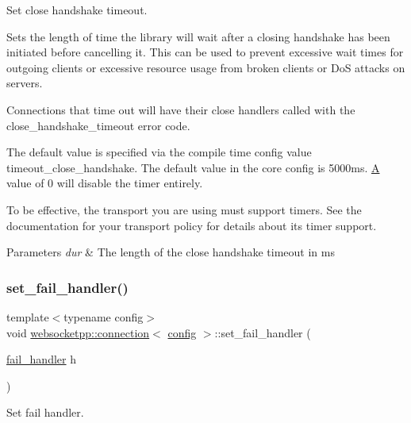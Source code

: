Set close handshake timeout. 

Sets the length of time the library will wait after a closing handshake has been initiated before cancelling it. This can be used to prevent excessive wait times for outgoing clients or excessive resource usage from broken clients or DoS attacks on servers.

Connections that time out will have their close handlers called with the close\+\_\+handshake\+\_\+timeout error code.

The default value is specified via the compile time config value \textquotesingle{}timeout\+\_\+close\+\_\+handshake\textquotesingle{}. The default value in the core config is 5000ms. \mbox{\hyperlink{struct_a}{A}} value of 0 will disable the timer entirely.

To be effective, the transport you are using must support timers. See the documentation for your transport policy for details about its timer support.


\begin{DoxyParams}{Parameters}
{\em dur} & The length of the close handshake timeout in ms \\
\hline
\end{DoxyParams}
\mbox{\label{classwebsocketpp_1_1connection_a8d2515bc6821f90c531efe77c8a32569}} 
\subsubsection{\texorpdfstring{set\+\_\+fail\+\_\+handler()}{set\_fail\_handler()}}
{\footnotesize\ttfamily template$<$typename config$>$ \\
void \mbox{\hyperlink{classwebsocketpp_1_1connection}{websocketpp\+::connection}}$<$ \mbox{\hyperlink{classconfig}{config}} $>$\+::set\+\_\+fail\+\_\+handler (\begin{DoxyParamCaption}\item[{\mbox{\hyperlink{namespacewebsocketpp_a5bb2e61cfe649b2e012f1a2c5693a4d5}{fail\+\_\+handler}}}]{h }\end{DoxyParamCaption})\hspace{0.3cm}{\ttfamily [inline]}}



Set fail handler. 

